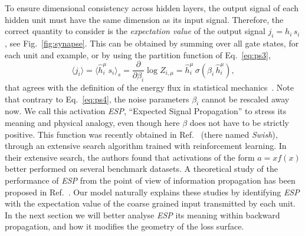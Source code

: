 \documentclass[5p]{elsarticle}
\begin{document}
 To ensure dimensional consistency across hidden layers, the output signal of each hidden unit must have the same dimension as its input signal. Therefore, the correct quantity to consider is the {\it expectation value} of the output signal $j_i = h_i \, s_i $, see  Fig.~\eqref{fig:synapse}.  This can be  obtained by summing over all gate states, for each unit and example, or by using the partition function of Eq.~\eqref{eq:ps3},
%
\begin{equation} \label{eq:ps5}
\langle j_i \rangle = \langle \hat{h}_i^{\mu} \, s_i \rangle_s = \frac{\partial}{\partial \beta_i} \log{Z_{i,\mu}} = \hat{h}^{\mu}_i \, \sigma(\beta_i \, \hat{h}^{\mu}_i),
\end{equation}
%
that agrees with the definition of the energy flux in statistical mechanics~\cite{bellac}. Note that contrary to Eq.~\eqref{eq:ps4}, the noise parameters $\beta_i$ cannot be rescaled away now. We call this activation {\it ESP},  ``Expected Signal Propagation'' to stress its meaning and physical analogy, even though here $\beta$ does not have to be strictly positive. This function was recently obtained in Ref.~\cite{prajit} (there named {\it Swish}), through an extensive search algorithm trained with reinforcement learning. In their extensive search, the authors found that activations of the form $a = x f(x)$  better performed on several benchmark datasets.
        A theoretical study of the performance of {\it ESP} from the point of view of information propagation has been proposed in Ref.~\cite{soufiane}.  Our model naturally explains these studies by identifying {\it ESP} with the expectation value of the coarse grained input transmitted by each unit. In the next section we will better analyse {\it ESP} its meaning within backward propagation, and how it modifies the geometry of the loss surface.
\end{document}
